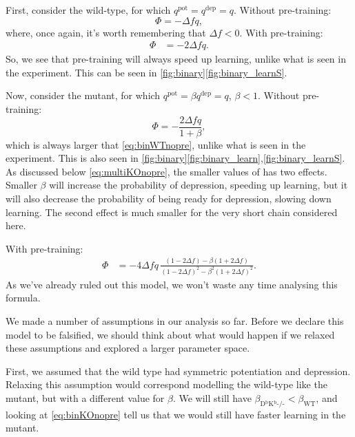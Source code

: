 \documentclass[12pt]{article}
\newcommand{\pot}{^{\text{pot}}}
\newcommand{\dep}{^{\text{dep}}}
\newcommand{\wt}{_{\text{WT}}}
\newcommand{\ko}{_{\text{D$^\mathrm{b}$K$^\mathrm{b}$-/-}}}
\begin{document}
First, consider the wild-type, for which $q\pot=q\dep=q$.
Without pre-training:
%
\begin{equation}\label{eq:binWTnopre}
  \Phi = -\Delta f q,
\end{equation}
%
where, once again, it's worth remembering that $\Delta f<0$.
With pre-training:
%
\begin{equation}\label{eq:binWTpre}
\begin{aligned}
  \Phi &= -2\Delta f q.
\end{aligned}
\end{equation}
%
So, we see that pre-training will always speed up learning, unlike what is seen in the experiment.
This can be seen in \autoref{fig:binary}\ref{fig:binary_learnS}.

Now, consider the mutant, for which $q\pot=\beta q\dep=q$, $\beta<1$.
Without pre-training:
%
\begin{equation}\label{eq:binKOnopre}
  \Phi = -\frac{2\Delta f q}{1+\beta},
\end{equation}
%
which is always larger that \eqref{eq:binWTnopre}, unlike what is seen in the experiment.
This is also seen in \autoref{fig:binary}\ref{fig:binary_learn},\ref{fig:binary_learnS}.
As discussed below \eqref{eq:multiKOnopre}, the smaller values of has two effects.
Smaller $\beta$ will increase the probability of depression, speeding up learning, but it will also decrease the probability of being ready for depression, slowing down learning.
The second effect is much smaller for the very short chain considered here.

With pre-training:
%
\begin{equation}\label{eq:binKOpre}
\begin{aligned}
  \Phi &= -4\Delta f q \, \frac{(1-2\Delta f) - \beta(1+2\Delta f)}
          {(1-2\Delta f)^2 - \beta^2(1+2\Delta f)^2}.
\end{aligned}
\end{equation}
%
As we've already ruled out this model, we won't waste any time analysing this formula.

We made a number of assumptions in our analysis so far.
Before we declare this model to be falsified, we should think about what would happen if we relaxed these assumptions and explored a larger parameter space.

First, we assumed that the wild type had symmetric potentiation and depression.
Relaxing this assumption would correspond modelling the wild-type like the mutant, but with a different value for $\beta$.
We will still have $\beta\ko<\beta\wt$, and looking at \eqref{eq:binKOnopre} tell us that we would still have faster learning in the mutant.
\end{document}
